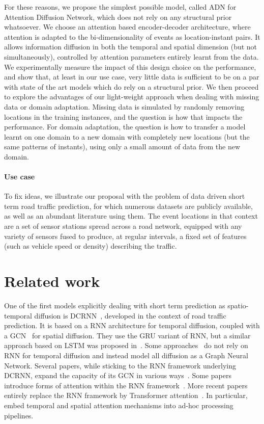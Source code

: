 \documentclass[a4paper]{article}
\begin{document}
For these reasons, we propose the simplest possible model, called ADN for Attention Diffusion Network, which does not rely on any structural prior whatsoever. We choose an attention based encoder-decoder architecture, where attention is adapted to the bi-dimensionality of events as location-instant pairs. It allows information diffusion in both the temporal and spatial dimension (but not simultaneously), controlled by attention parameters entirely learnt from the data. We experimentally measure the impact of this design choice on the performance, and show that, at least in our use case, very little data is sufficient to be on a par with state of the art models which do rely on a structural prior. We then proceed to explore the advantages of our light-weight approach when dealing with missing data or domain adaptation. Missing data is simulated by randomly removing locations in the training instances, and the question is how that impacts the performance. For domain adaptation, the question is how to transfer a model learnt on one domain to a new domain with completely new locations (but the same patterns of instants), using only a small amount of data from the new domain.

\paragraph{Use case}
To fix ideas, we illustrate our proposal with the problem of data driven short term road traffic prediction, for which numerous datasets are publicly available, as well as an abundant literature using them. The event locations in that context are a set of sensor stations spread across a road network, equipped with any variety of sensors fused to produce, at regular intervals, a fixed set of features (such as vehicle speed or density) describing the traffic.
\section{Related work}
One of the first models explicitly dealing with short term prediction as spatio-temporal diffusion is DCRNN~\cite{li_diffusion_2017}, developed in the context of road traffic prediction. It is based on a RNN architecture for temporal diffusion, coupled with a GCN~\cite{defferrard_convolutional_2016,kipf_semi-supervised_2016} for spatial diffusion. They use the GRU variant of RNN, but a similar approach based on LSTM was proposed in~\cite{shi_convolutional_2015}. Some approaches~\cite{song_spatial-temporal_2020,li_spatial-temporal_2021} do not rely on RNN for temporal diffusion and instead model all diffusion as a Graph Neural Network. Several papers, while sticking to the RNN framework underlying DCRNN, expand the capacity of its GCN in various ways~\cite{lee_ddp-gcn_2020,yu_forecasting_2020,wu_graph_2019,he_stcnn:_2019}. Some papers introduce forms of attention within the RNN framework~\cite{he_stann:_2019,liu_traffic_2019}. More recent papers entirely replace the RNN framework by Transformer attention~\cite{vaswani_attention_2017}. In particular, \cite{zheng_gman_2019,xu_spatial-temporal_2020,park_st-grat_2020,cai_traffic_2020} embed temporal and spatial attention mechanisms into ad-hoc processing pipelines.
\end{document}
